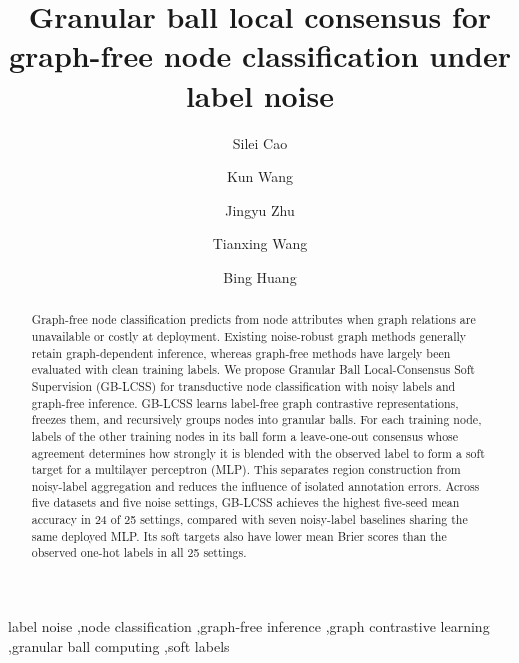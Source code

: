 \documentclass[times,review,10pt]{elsarticle}
\theoremstyle{definition}
\theoremstyle{plain}
\begin{document}
\begin{frontmatter}

\title{Granular ball local consensus for graph-free node classification under label noise}

\author[inst1]{{\footnotesize Silei Cao}}
\author[inst1]{{\footnotesize Kun Wang}}
\author[inst2]{{\footnotesize Jingyu Zhu}}
\author[inst3]{{\footnotesize Tianxing Wang}}
\author[inst1]{{\footnotesize Bing Huang}}


\begin{abstract}
\renewcommand{\baselinestretch}{1.5}\selectfont
Graph-free node classification predicts from node attributes when graph relations are unavailable or costly at deployment. Existing noise-robust graph methods generally retain graph-dependent inference, whereas graph-free methods have largely been evaluated with clean training labels. We propose Granular Ball Local-Consensus Soft Supervision (GB-LCSS) for transductive node classification with noisy labels and graph-free inference. GB-LCSS learns label-free graph contrastive representations, freezes them, and recursively groups nodes into granular balls. For each training node, labels of the other training nodes in its ball form a leave-one-out consensus whose agreement determines how strongly it is blended with the observed label to form a soft target for a multilayer perceptron (MLP). This separates region construction from noisy-label aggregation and reduces the influence of isolated annotation errors. Across five datasets and five noise settings, GB-LCSS achieves the highest five-seed mean accuracy in 24 of 25 settings, compared with seven noisy-label baselines sharing the same deployed MLP. Its soft targets also have lower mean Brier scores than the observed one-hot labels in all 25 settings.
\end{abstract}

\begin{keyword}
label noise \sep node classification \sep graph-free inference \sep graph contrastive learning \sep granular ball computing \sep soft labels
\end{keyword}

\end{frontmatter}
\end{document}
